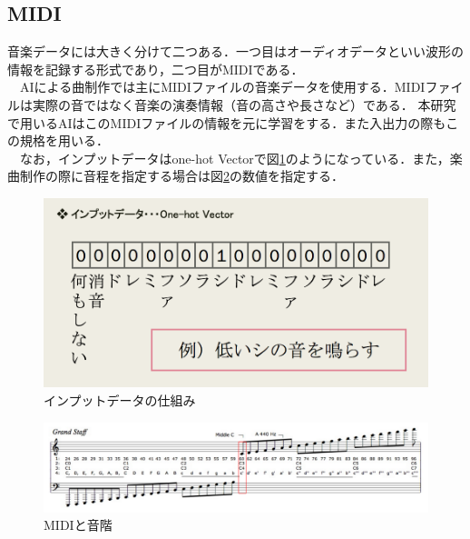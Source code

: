\subsection{MIDI}
音楽データには大きく分けて二つある．一つ目はオーディオデータといい波形の情報を記録する形式であり，二つ目がMIDIである．\\
　AIによる曲制作では主にMIDIファイルの音楽データを使用する．MIDIファイルは実際の音ではなく音楽の演奏情報（音の高さや長さなど）である．
本研究で用いるAIはこのMIDIファイルの情報を元に学習をする．また入出力の際もこの規格を用いる．\\
　なお，インプットデータはone-hot Vectorで図\ref{fig:インプットデータの仕組み}のようになっている．また，楽曲制作の際に音程を指定する場合は図\ref{fig:MIDIと音階}の数値を指定する．
\begin{figure}[h]
    \begin{screen}
    \begin{center}
        \includegraphics[scale=0.85,clip]{./img/midi1.png}
        \caption{インプットデータの仕組み}
        \label{fig:インプットデータの仕組み}
    \end{center}
    \end{screen}
\end{figure}
\newpage
\begin{figure}[h]
    \begin{screen}
    \begin{center}
        \includegraphics[scale=0.45,clip]{./img/midi2.png}
        \caption{MIDIと音階}
        \label{fig:MIDIと音階}
    \end{center}
    \end{screen}
\end{figure}
\newpage
